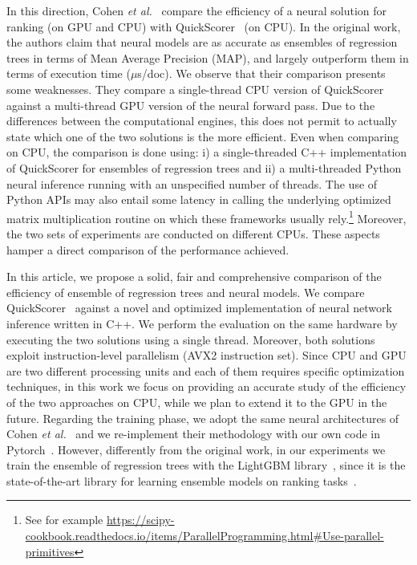 In this direction, Cohen \textit{et al.}~\cite{cohen2018universal} compare the efficiency of a neural solution for ranking (on GPU and CPU) with QuickScorer~\cite{lucchese2015quickscorer} (on CPU).
In the original work, the authors claim that neural models are as accurate as ensembles of regression trees in terms of Mean Average Precision (MAP), and largely outperform them in terms of execution time ($\mu$s/doc). We observe that their comparison presents some weaknesses.
They compare a single-thread CPU version of QuickScorer against a multi-thread GPU version of the neural forward pass. Due to the differences between the computational engines, this does not permit to actually state which one of the two solutions is the more efficient.
 Even when comparing on CPU, the comparison is done using: i) a single-threaded C++ implementation of QuickScorer for ensembles of regression trees and ii) a multi-threaded Python neural inference running with an unspecified number of threads. The use of Python APIs may also entail some latency in calling the underlying optimized matrix multiplication routine on which these frameworks usually rely.\footnote{See for example \url{https://scipy-cookbook.readthedocs.io/items/ParallelProgramming.html\#Use-parallel-primitives}} 
Moreover, the two sets of experiments are conducted on different CPUs. These aspects hamper a direct comparison of the performance achieved.


In this article, we propose a solid, fair and comprehensive comparison of the efficiency of ensemble of regression trees and neural models.
We compare QuickScorer~\cite{dato2016fast} against a novel and optimized implementation of neural network inference written in C++. We perform the evaluation on the same hardware by executing the two solutions using a single thread. Moreover, both solutions exploit instruction-level parallelism (AVX2 instruction set). Since CPU and GPU are two different processing units and each of them requires specific optimization techniques, in this work we focus on providing an accurate study of the efficiency of the two approaches on CPU, while we plan to extend it to the GPU in the future. Regarding the training phase, we adopt the same neural architectures of Cohen \textit{et al.}~\cite{cohen2018universal} and we re-implement their methodology with our own code in Pytorch~\cite{NEURIPS2019_9015}. However, differently from the original work, in our experiments we train the ensemble of regression trees with the LightGBM library~\cite{NIPS2017_6907}, since it is the state-of-the-art library for learning ensemble models on ranking tasks~\cite{NIPS2017_6907,qin2020neural}.

